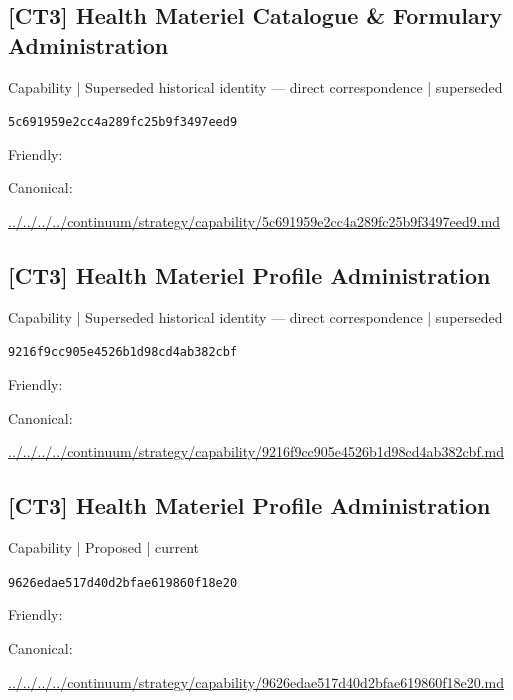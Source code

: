 \documentclass[10pt,a4paper]{article}
\begin{document}
\subsection*{[CT3] Health Materiel Catalogue \& Formulary Administration}
{\small Capability | Superseded historical identity — direct correspondence | superseded}\par
\texttt{5c691959e2cc4a289fc25b9f3497eed9}\par
Friendly: \par
Canonical: \par
{\footnotesize\url{../../../../continuum/strategy/capability/5c691959e2cc4a289fc25b9f3497eed9.md}}\par
\subsection*{[CT3] Health Materiel Profile Administration}
{\small Capability | Superseded historical identity — direct correspondence | superseded}\par
\texttt{9216f9cc905e4526b1d98cd4ab382cbf}\par
Friendly: \par
Canonical: \par
{\footnotesize\url{../../../../continuum/strategy/capability/9216f9cc905e4526b1d98cd4ab382cbf.md}}\par
\subsection*{[CT3] Health Materiel Profile Administration}
{\small Capability | Proposed | current}\par
\texttt{9626edae517d40d2bfae619860f18e20}\par
Friendly: \par
Canonical: \par
{\footnotesize\url{../../../../continuum/strategy/capability/9626edae517d40d2bfae619860f18e20.md}}\par
\end{document}
